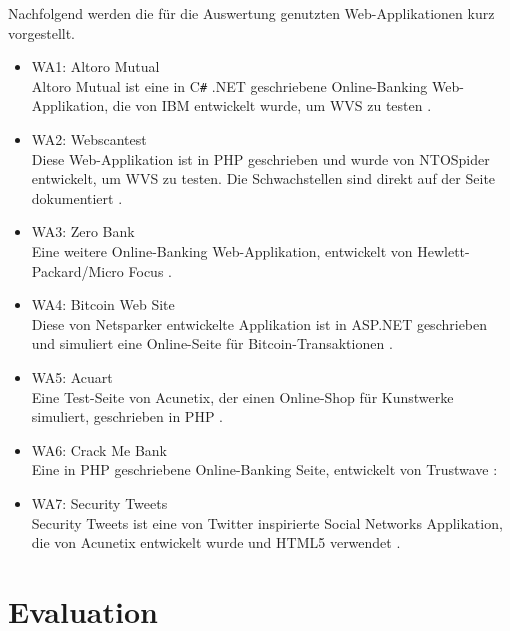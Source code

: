 \documentclass[12pt,oneside,a4paper,parskip,pointlessnumbers]{scrbook}
\begin{document}
  Nachfolgend werden die für die Auswertung genutzten Web-Applikationen kurz vorgestellt.
  \begin{itemize}
    \item WA1: Altoro Mutual\\
    Altoro Mutual ist eine in C\texttt{\#} .NET geschriebene Online-Banking Web-Applikation, die von IBM entwickelt wurde, um WVS zu testen \cite{Altoro}.
    \item WA2: Webscantest\\
    Diese Web-Applikation ist in PHP geschrieben und wurde von NTOSpider entwickelt, um WVS zu testen. Die Schwachstellen sind direkt auf der Seite dokumentiert \cite{Webscantest}.
    \item WA3: Zero Bank\\
    Eine weitere Online-Banking Web-Applikation, entwickelt von Hewlett-Packard/Micro Focus \cite{Zero}.
    \item WA4: Bitcoin Web Site\\
    Diese von Netsparker entwickelte Applikation ist in ASP.NET geschrieben und simuliert eine Online-Seite für Bitcoin-Transaktionen \cite{Aspnet}.
    \item WA5: Acuart\\
    Eine Test-Seite von Acunetix, der einen Online-Shop für Kunstwerke simuliert, geschrieben in PHP \cite{Acuart}.
    \item WA6: Crack Me Bank\\
    Eine in PHP geschriebene Online-Banking Seite, entwickelt von Trustwave \cite{CrackMeBank}:
    \item WA7: Security Tweets\\
    Security Tweets ist eine von Twitter inspirierte Social Networks Applikation, die von Acunetix entwickelt wurde und HTML5 verwendet \cite{Tweets}.
 \end{itemize}
\chapter{Evaluation}
\end{document}
